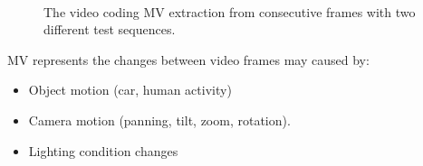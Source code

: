 \begin{figure}
\centering
{}
\\
\caption{The video coding MV extraction from consecutive frames with two different test sequences.}
\label{fig:mvextract}
\end{figure}
MV represents the changes between video frames may caused by:
\begin{itemize}
\item Object motion (car, human activity)
\item Camera motion (panning, tilt, zoom, rotation).
\item Lighting condition changes
\end{itemize}
